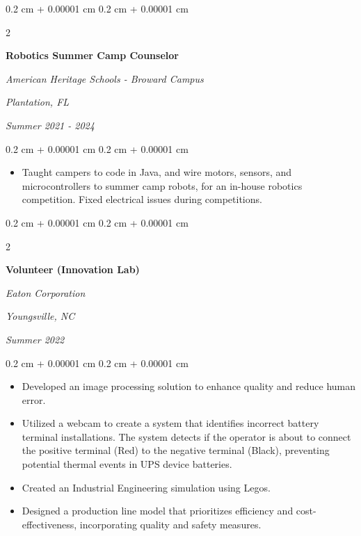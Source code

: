 \documentclass[10pt, letterpaper]{article}
\newenvironment{highlights}{
    \begin{itemize}[
        topsep=0.10 cm,
        parsep=0.10 cm,
        partopsep=0pt,
        itemsep=0pt,
        leftmargin=0.4 cm + 10pt
    ]
}{
    \end{itemize}
} %
\newenvironment{onecolentry}{
    \begin{adjustwidth}{
        0.2 cm + 0.00001 cm
    }{
        0.2 cm + 0.00001 cm
    }
}{
    \end{adjustwidth}
} %
\newenvironment{twocolentry}[2][]{
    \onecolentry
    \def\secondColumn{#2}
    \setcolumnwidth{\fill, 4.5 cm}
    \begin{paracol}{2}
}{
    \switchcolumn \raggedleft \secondColumn
    \end{paracol}
    \endonecolentry
} %
\begin{document}
        \vspace{0.2 cm}

        \begin{twocolentry}{
        \textit{Plantation, FL}    
            
        \textit{Summer 2021 - 2024}}
            \textbf{Robotics Summer Camp Counselor}
            
            \textit{American Heritage Schools - Broward Campus}
        \end{twocolentry}

        \vspace{0.10 cm}
        \begin{onecolentry}
            \begin{highlights}
                \item Taught campers to code in Java, and wire motors, sensors, and microcontrollers to summer camp robots, for an in-house robotics competition. Fixed electrical issues during competitions. 
            \end{highlights}
        \end{onecolentry}

        \vspace{0.2 cm}

        \begin{twocolentry}{
        \textit{Youngsville, NC}    
            
        \textit{Summer 2022}}
            \textbf{Volunteer (Innovation Lab)}
            
            \textit{Eaton Corporation}
        \end{twocolentry}

        \vspace{0.10 cm}
        \begin{onecolentry}
            \begin{highlights}
                \item Developed an image processing solution to enhance quality and reduce human error.
                \item Utilized a webcam to create a system that identifies incorrect battery terminal
                installations. The system detects if the operator is about to connect the positive terminal
                (Red) to the negative terminal (Black), preventing potential thermal events in UPS device
                batteries.
                \item Created an Industrial Engineering simulation using Legos.
                \item Designed a production line model that prioritizes efficiency and cost-effectiveness,
                incorporating quality and safety measures. 
                
            \end{highlights}
        \end{onecolentry}
\end{document}
